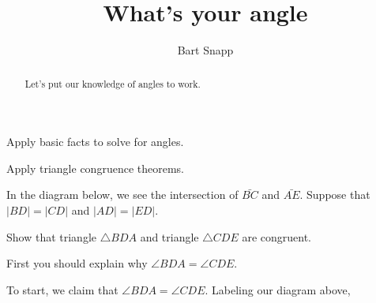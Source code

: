 \documentclass[handout,nooutcomes,noauthor,hints]{ximera}
\title{What's your angle}
\author{Bart Snapp}
\begin{document}
\begin{abstract}
  Let's put our knowledge of angles to work. 
\end{abstract}
\maketitle


\begin{listOutcomes}
\item Apply basic facts to solve for angles.
\item Apply triangle congruence theorems.
\item 
\end{listOutcomes}

\mynewpage



\begin{question}
  In the diagram below, we see the intersection of $\bar{BC}$ and
  $\bar{AE}$. Suppose that $\left\vert BD\right\vert =\left\vert
  CD\right\vert $ and $\left\vert AD\right\vert =\left\vert
  ED\right\vert $.
  \begin{center}
  \end{center}
  Show that triangle $\triangle BDA$ and triangle $\triangle CDE$ are
  congruent.
  
  \begin{hint}
    First you should explain why $\angle BDA = \angle CDE$.
  \end{hint}
  \begin{freeResponse}
    To start, we claim that $\angle BDA = \angle CDE$. Labeling our
    diagram above,
    \begin{center}
\end{center}
\end{freeResponse}
\end{question}
\end{document}
